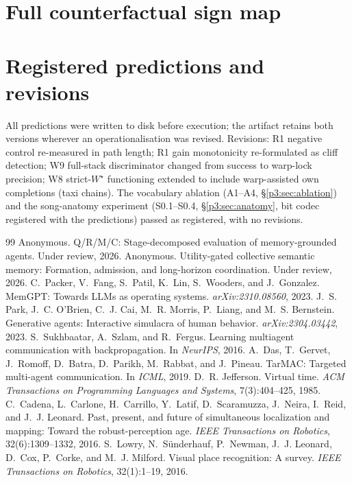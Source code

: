\documentclass{article}
\newcommand{\wstar}{W^{\star}}
\begin{document}
\section{Full counterfactual sign map}
\label{p2:app:signmap}
\FloatBarrier

\clearpage

\section{Registered predictions and revisions}
\label{p3:app:registered}
All predictions were written to disk before execution; the artifact
retains both versions wherever an operationalisation was revised.
Revisions: R1 negative control re-measured in path length; R1 gain
monotonicity re-formulated as cliff detection; W9 full-stack
discriminator changed from success to warp-lock precision; W8
strict-$\wstar$ functioning extended to include warp-assisted own
completions (taxi chains). The vocabulary ablation (A1--A4,
\S\ref{p3:sec:ablation}) and the song-anatomy experiment (S0.1--S0.4,
\S\ref{p3:sec:anatomy}, bit codec registered with the predictions)
passed as registered, with no revisions.


\begin{thebibliography}{99}
Anonymous.
\newblock Q/R/M/C: Stage-decomposed evaluation of memory-grounded agents.
\newblock Under review, 2026.
Anonymous.
\newblock Utility-gated collective semantic memory: Formation, admission, and long-horizon coordination.
\newblock Under review, 2026.
C.~Packer, V.~Fang, S.~Patil, K.~Lin, S.~Wooders, and J.~Gonzalez.
\newblock MemGPT: Towards LLMs as operating systems.
\newblock \emph{arXiv:2310.08560}, 2023.
J.~S. Park, J.~C. O'Brien, C.~J. Cai, M.~R. Morris, P.~Liang, and M.~S. Bernstein.
\newblock Generative agents: Interactive simulacra of human behavior.
\newblock \emph{arXiv:2304.03442}, 2023.
S.~Sukhbaatar, A.~Szlam, and R.~Fergus.
\newblock Learning multiagent communication with backpropagation.
\newblock In \emph{NeurIPS}, 2016.
A.~Das, T.~Gervet, J.~Romoff, D.~Batra, D.~Parikh, M.~Rabbat, and
J.~Pineau.
\newblock TarMAC: Targeted multi-agent communication.
\newblock In \emph{ICML}, 2019.
D.~R. Jefferson.
\newblock Virtual time.
\newblock \emph{ACM Transactions on Programming Languages and Systems},
7(3):404--425, 1985.
C.~Cadena, L.~Carlone, H.~Carrillo, Y.~Latif, D.~Scaramuzza,
J.~Neira, I.~Reid, and J.~J. Leonard.
\newblock Past, present, and future of simultaneous localization and
mapping: Toward the robust-perception age.
\newblock \emph{IEEE Transactions on Robotics}, 32(6):1309--1332, 2016.
S.~Lowry, N.~S\"underhauf, P.~Newman, J.~J. Leonard, D.~Cox,
P.~Corke, and M.~J. Milford.
\newblock Visual place recognition: A survey.
\newblock \emph{IEEE Transactions on Robotics}, 32(1):1--19, 2016.
\end{thebibliography}
\end{document}

